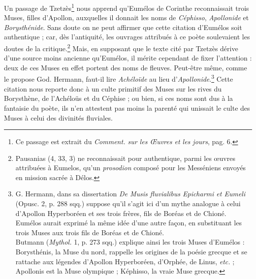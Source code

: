 \documentclass[landscape, a4paper, 11pt, oneside, polutonikogreek, french]{article}
\begin{document}
Un passage de Tzetzès\footnote{Ce passage est extrait du \emph{Comment. sur les Œuvres et les jours}, pag. 6.} nous apprend qu'Eumélos de Corinthe reconnaissait trois Muses, filles d'Apollon, auxquelles il donnait les noms de \emph{Céphisso}, \emph{Apollonide} et \emph{Borysthénide}. Sans doute on ne peut affirmer que cette citation d'Eumélos soit authentique ; car, dès l'antiquité, les ouvrages attribués à ce poète soulevaient les doutes de la critique.\footnote{Pausanias (4, 33, 3) ne reconnaissait pour authentique, parmi les œuvres attribuées à Eumelos, qu'un \emph{prosodion} composé pour les Messéniens envoyés en mission sacrée à Délos.} Mais, en supposant que le texte cité par Tzetzès dérive d'une source moins ancienne qu'Eumélos, il mérite cependant de fixer l'attention : deux de ces Muses en effet portent des noms de fleuves. Peut-être même, comme le propose God. Hermann, faut-il lire \emph{Achéloïde} au lieu d'\emph{Apollonide}.\footnote{G. Hermann, dans sa dissertation \emph{De Musis fluvialibus Epicharmi et Eumeli} (Opusc. 2, p. 288 sqq.) suppose qu'il s'agit ici d'un mythe analogue à celui d'Apollon Hyperboréen et ses trois frères, fils de Boréas et de Chioné. Eumélos aurait exprimé la même idée d'une autre façon, en substituant les trois Muses aux trois fils de Boréas et de Chioné.\\\hspace*{5mm}Butmann (\emph{Mythol.} 1, p. 273 sqq.) explique ainsi les trois Muses d'Eumélos : Borysthénis, la Muse du nord, rappelle les origines de la poésie grecque et se rattache aux légendes d'Apollon Hyperboréen, d'Orphée, de Linus, \emph{etc.} ; Apollonis est la Muse olympique ; Képhisso, la vraie Muse grecque.} Cette citation nous reporte donc à un culte primitif des Muses sur les rives du Borysthène, de l'Achéloüs et du Céphise ; ou bien, si ces noms sont dus à la fantaisie du poète, ils n'en attestent pas moins la parenté qui unissait le culte des Muses à celui des divinités fluviales.
\end{document}

